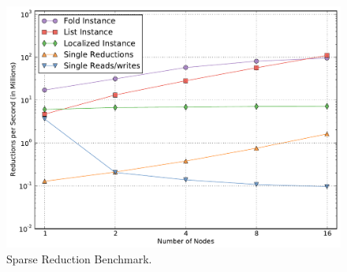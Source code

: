 \begin{figure}
\begin{center}
\includegraphics[scale=0.33]{figs/reduce_sparse.pdf}
\end{center}
\vspace{-6mm}
\caption{Sparse Reduction Benchmark.\label{fig:reducsparse}}
\vspace{-4mm}
\end{figure}

